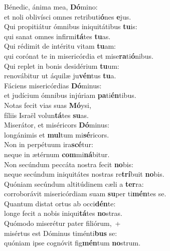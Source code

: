 \evenverse Bénedic, ánima mea, \textbf{Dó}mino:~\*\\
\evenverse et noli oblivísci omnes retributi\textbf{ó}nes \textbf{e}jus.\\
\oddverse Qui propitiátur ómnibus iniquitátibus \textbf{tu}is:~\*\\
\oddverse qui sanat omnes infirmi\textbf{tá}tes \textbf{tu}as.\\
\evenverse Qui rédimit de intéritu vitam \textbf{tu}am:~\*\\
\evenverse qui corónat te in misericórdia et mise\textbf{ra}ti\textbf{ó}nibus.\\
\oddverse Qui replet in bonis desidérium \textbf{tu}um:~\*\\
\oddverse renovábitur ut áquilæ ju\textbf{vén}tus \textbf{tu}a.\\
\evenverse Fáciens misericórdias \textbf{Dó}minus:~\*\\
\evenverse et judícium ómnibus injúriam \textbf{pa}ti\textbf{én}tibus.\\
\oddverse Notas fecit vias suas \textbf{Mó}ysi,~\*\\
\oddverse fíliis Israël volun\textbf{tá}tes \textbf{su}as.\\
\evenverse Miserátor, et miséricors \textbf{Dó}minus:~\*\\
\evenverse longánimis et \textbf{mul}tum mi\textbf{sé}ricors.\\
\oddverse Non in perpétuum ira\textbf{scé}tur:~\*\\
\oddverse neque in ætérnum \textbf{com}mi\textbf{ná}bitur.\\
\evenverse Non secúndum peccáta nostra fecit \textbf{no}bis:~\*\\
\evenverse neque secúndum iniquitátes nostras re\textbf{trí}buit \textbf{no}bis.\\
\oddverse Quóniam secúndum altitúdinem cæli a \textbf{ter}ra:~\*\\
\oddverse corroborávit misericórdiam suam \textbf{su}per ti\textbf{mén}tes se.\\
\evenverse Quantum distat ortus ab occi\textbf{dén}te:~\*\\
\evenverse longe fecit a nobis iniqui\textbf{tá}tes \textbf{no}stras.\\
\oddverse Quómodo miserétur pater filiórum,~+\\
\oddverse  misértus est Dóminus timénti\textbf{bus} se:~\*\\
\oddverse quóniam ipse cognóvit fig\textbf{mén}tum \textbf{no}strum.\\

